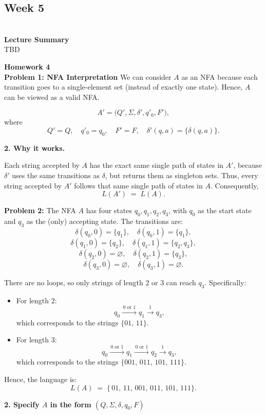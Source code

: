 \documentclass{article}
\theoremstyle{theorem}
\theoremstyle{definition}
\theoremstyle{remark}
\begin{document}
\subsection{\textbf{Week 5}}\\
\textbf{Lecture Summary}\\
TBD

\textbf{Homework 4}\\
\textbf{Problem 1: NFA Interpretation}
We can consider $A$ as an NFA because each transition goes to a 
single-element set (instead of exactly one state). Hence, $A$ 
can be viewed as a valid NFA.

\[
A' = \bigl(Q', \Sigma, \delta', q'_0, F'\bigr),
\]
where
\[
Q' = Q, 
\quad
q'_0 = q_0, 
\quad
F' = F,
\quad
\delta'(q,a) = \{\delta(q,a)\}.
\]

\textbf{2. Why it works.}

Each string accepted by $A$ has the exact same single path of states 
in $A'$, because $\delta'$ uses the same transitions as $\delta$, 
but returns them as singleton sets. 
Thus, every string accepted by $A'$ follows that same single path of 
states in $A$. Consequently,
\[
L(A') \;=\; L(A).
\]

\textbf{Problem 2:}
The NFA $A$ has four states $q_0, q_1, q_2, q_3$, with $q_0$ as the 
start state and $q_3$ as the (only) accepting state. The transitions are:
\[
\delta(q_0,0) = \{q_1\}, \quad
\delta(q_0,1) = \{q_1\},
\]
\[
\delta(q_1,0) = \{q_2\}, \quad
\delta(q_1,1) = \{q_2, q_3\},
\]
\[
\delta(q_2,0) = \varnothing, \quad
\delta(q_2,1) = \{q_3\},
\]
\[
\delta(q_3,0) = \varnothing, \quad
\delta(q_3,1) = \varnothing.
\]

There are no loops, so only strings of length $2$ or $3$ can reach $q_3$. 
Specifically:
\begin{itemize}
\item For length $2$: 
  \[
    q_0 \xrightarrow{\,0\text{ or }1\,} q_1 
    \xrightarrow{\,1\,} q_3,
  \]
  which corresponds to the strings $\{01,\,11\}$.
\item For length $3$:
  \[
    q_0 \xrightarrow{\,0\text{ or }1\,} q_1
    \xrightarrow{\,0\text{ or }1\,} q_2
    \xrightarrow{\,1\,} q_3,
  \]
  which corresponds to the strings $\{001,\,011,\,101,\,111\}$.
\end{itemize}

Hence, the language is:
\[
L(A) \;=\; \{\,01,\,11,\,001,\,011,\,101,\,111\}.
\]

\textbf{2. Specify $A$ in the form $(Q,\Sigma,\delta,q_0,F)$}
\end{document}
